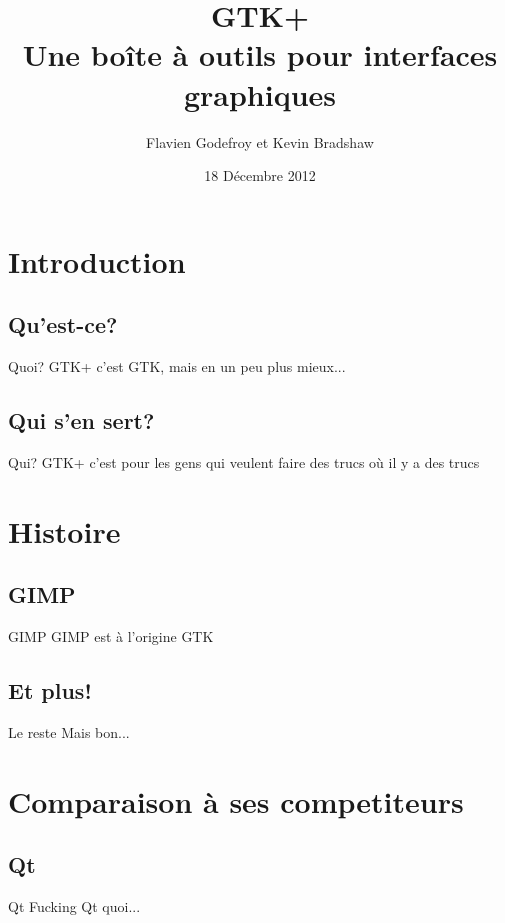 \documentclass{beamer}
\title[GTK+]{GTK+\\Une boîte à outils pour interfaces graphiques}
\author{Flavien Godefroy et Kevin Bradshaw}
\date{18 Décembre 2012}
\begin{document}
\begin{frame}
\titlepage
\end{frame}


\section{Introduction}

\subsection{Qu'est-ce?}
\begin{frame}{Quoi?}
GTK+ c'est GTK, mais en un peu plus mieux...
\end{frame}

\subsection{Qui s'en sert?}
\begin{frame}{Qui?}
GTK+ c'est pour les gens qui veulent faire des trucs où il y a des trucs
\end{frame}


\section{Histoire}
\subsection{GIMP}
\begin{frame}{GIMP}
GIMP est à l'origine GTK
\end{frame}

\subsection{Et plus!}
\begin{frame}{Le reste}
Mais bon...
\end{frame}


\section{Comparaison à ses competiteurs}
\subsection{Qt}
\begin{frame}{Qt}
Fucking Qt quoi...
\end{frame}
\end{document}
